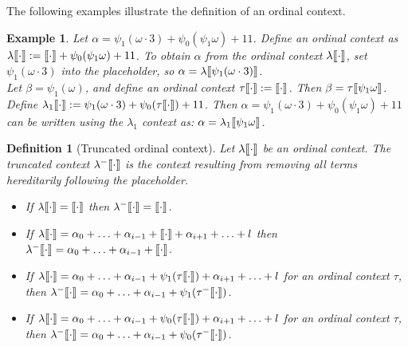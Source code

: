 \documentclass{amsart}
\theoremstyle{plain}
\theoremstyle{plain}
\newtheorem{example}[theorem]{Example}
\newtheorem*{definition}{Definition}
\def\scbrl{[\hspace{-.14em}[}
\def\scbrr{]\hspace{-.14em}]}
\def\scbr#1{\scbrl#1\scbrr}
\newcommand{\al}{{\alpha}}
\newcommand{\be}{{\beta}}
\newcommand{\la}{\lambda}
\newcommand{\om}{\omega}
\def\scbrl{[\hspace{-.14em}[}
\def\scbrr{]\hspace{-.14em}]}
\def\scbr#1{\scbrl#1\scbrr}
\begin{document}
\smallskip
The following examples illustrate the definition of an ordinal context.
\begin{example}
Let $\al= \psi_1{(\om\cdot 3)}  + \psi_0{(\psi_1\om)}+ 11$. 
Define an ordinal context as $\la\scbr{\cdot} :=  \scbr{\cdot} + \psi_0{(\psi_1\om)} +11$. To obtain $\al$ from the ordinal context $\la\scbr{\cdot} $, set $\psi_1{(\om\cdot 3)}$ into the placeholder, so $\al = \la\scbr{\psi_1{(\om\cdot 3)}}$.
\medskip\\
Let $\be = \psi_1(\om)$, and define an ordinal context $\tau\scbr{\cdot} :=\scbr{\cdot}$. Then $\be=\tau\scbr{\psi_1\om}$. 
Define $\la_1\scbr{\cdot}:= \psi_1(\om\cdot 3) + \psi_0(\tau\scbr{\cdot}) +11$.
Then $\al =\psi_1{(\om\cdot 3)}  + \psi_0{(\psi_1\om)}+ 11$ can be written using the $\la_1$ context as:
$\al= \la_1\scbr{\psi_1\om}$.
\end{example}

\smallskip


\begin{definition}[Truncated ordinal context]
Let $\la\scbr{\cdot}$ be an ordinal context. The truncated context $\lambda^-\scbr{\cdot}$ is the context resulting from removing all terms hereditarily following the placeholder.
\begin{itemize}
    \item If $\la\scbr{\cdot} = \scbr{\cdot}$ then $\la^-\scbr{\cdot} =\scbr{\cdot}$.
    
    \item If $\la\scbr{\cdot}=\al_0 + \ldots +\al_{i-1} +\scbr{\cdot} + \al_{i+1}+\ldots +l$ then 
    $\la^-\scbr{\cdot}=\al_0 + \ldots +\al_{i-1} + \scbr{\cdot}$.
    
    \item If $\la\scbr{\cdot}= \al_0 + \ldots +\al_{i-1}+ \psi_1(\tau{\scbr{\cdot}})+\al_{i+1}+\ldots +l$ for an ordinal context $\tau$,
    then $\la^-\scbr{\cdot}=\al_0 + \ldots +\al_{i-1}+ \psi_1(\tau^-{\scbr{\cdot}})$.
    
    \item If $\la\scbr{\cdot}=\al_0 + \ldots +\al_{i-1}+ \psi_0(\tau{\scbr{\cdot}})+\al_{i+1}+\ldots +l$ for an ordinal context $\tau$,
    then $\la^-\scbr{\cdot}= \al_0 + \ldots +\al_{i-1}+ \psi_0(\tau^-{\scbr{\cdot}})$.		
\end{itemize}
\end{definition}
\smallskip
\end{document}
